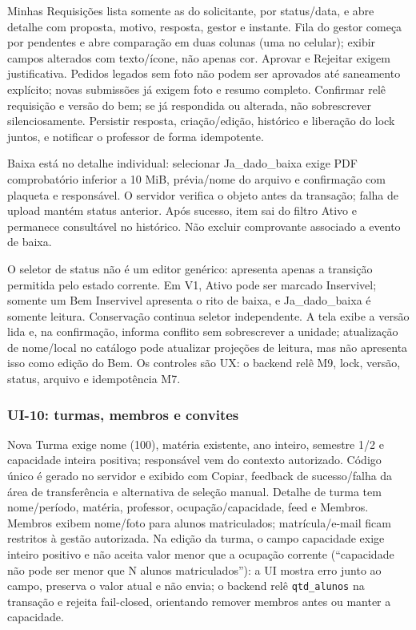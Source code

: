 Minhas Requisições lista somente as do solicitante, por status/data, e abre detalhe com proposta, motivo, resposta, gestor e instante. Fila do gestor começa por pendentes e abre comparação em duas colunas (uma no celular); exibir campos alterados com texto/ícone, não apenas cor. Aprovar e Rejeitar exigem justificativa. Pedidos legados sem foto não podem ser aprovados até saneamento explícito; novas submissões já exigem foto e resumo completo. Confirmar relê requisição e versão do bem; se já respondida ou alterada, não sobrescrever silenciosamente. Persistir resposta, criação/edição, histórico e liberação do lock juntos, e notificar o professor de forma idempotente.

Baixa está no detalhe individual: selecionar Ja\_dado\_baixa exige PDF comprobatório inferior a 10 MiB, prévia/nome do arquivo e confirmação com plaqueta e responsável. O servidor verifica o objeto antes da transação; falha de upload mantém status anterior. Após sucesso, item sai do filtro Ativo e permanece consultável no histórico. Não excluir comprovante associado a evento de baixa.

O seletor de status não é um editor genérico: apresenta apenas a transição
permitida pelo estado corrente. Em V1, Ativo pode ser marcado Inservivel;
somente um Bem Inservivel apresenta o rito de baixa, e Ja\_dado\_baixa é somente
leitura. Conservação continua seletor independente. A tela exibe a versão lida
e, na confirmação, informa conflito sem sobrescrever a unidade; atualização de
nome/local no catálogo pode atualizar projeções de leitura, mas não apresenta
isso como edição do Bem. Os controles são UX: o backend relê M9, lock, versão,
status, arquivo e idempotência M7.

\subsubsection{UI-10: turmas, membros e convites}
Nova Turma exige nome (100), matéria existente, ano inteiro, semestre 1/2 e capacidade inteira positiva; responsável vem do contexto autorizado. Código único é gerado no servidor e exibido com Copiar, feedback de sucesso/falha da área de transferência e alternativa de seleção manual. Detalhe de turma tem nome/período, matéria, professor, ocupação/capacidade, feed e Membros. Membros exibem nome/foto para alunos matriculados; matrícula/e-mail ficam restritos à gestão autorizada. Na edição da turma, o campo capacidade exige inteiro positivo e não aceita valor menor que a ocupação corrente (``capacidade não pode ser menor que N alunos matriculados''): a UI mostra erro junto ao campo, preserva o valor atual e não envia; o backend relê \texttt{qtd\_alunos} na transação e rejeita fail-closed, orientando remover membros antes ou manter a capacidade.

